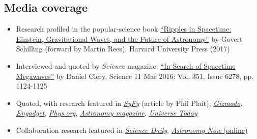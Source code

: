 \documentclass[11pt,letterpaper,sans]{moderncv}
\begin{document}
\subsection{Media coverage}
\begin{itemize}[leftmargin=8mm]
\item Research profiled in the popular-science book {\color{color1} \href{https://books.google.com/books/about/Ripples_in_Spacetime.html?id=YicuDwAAQBAJ&hl=en}{``Ripples in Spacetime: Einstein, Gravitational Waves, and the Future of Astronomy''}} by Govert Schilling (forward by Martin Rees), Harvard University Press (2017)
\item Interviewed and quoted by \textit{Science} magazine: {\color{color1} \href{http://science.sciencemag.org/content/351/6278/1124}{``In Search of Spacetime Megawaves''}} by Daniel Clery, Science  11 Mar 2016: Vol. 351, Issue 6278, pp. 1124-1125
\item Quoted, with research featured in {\color{color1} \href{https://www.syfy.com/syfywire/pulsars-black-holes-spacetime-center-of-the-solar-system}{\textit{SyFy}}} (article by Phil Plait), {\color{color1} \href{http://gizmodo.com/we-could-find-even-more-gravitational-waves-soon-with-p-1761021828}{\textit{Gizmodo}}}, {\color{color1} \href{https://www.engadget.com/2016/02/25/pulsars-gravitational-waves-black-holes/}{\textit{Engadget}}}, {\color{color1} \href{http://phys.org/news/2016-02-pulsar-web-low-frequency-gravitational.html}{\textit{Phys.org}}},  {\color{color1} \href{http://www.astronomy.com/news/2016/02/pulsar-web-could-detect-gravitational-waves}{\textit{Astronomy magazine}}}, {\color{color1} \href{http://www.universetoday.com/127562/the-future-of-gravitational-wave-astronomy-enhanced-ligo-pulsar-webs-space-interferometers-and-everything/}{\textit{Universe Today}}}
\item Collaboration research featured in {\color{color1} \href{https://www.sciencedaily.com/releases/2016/04/160405122609.htm}{\textit{Science Daily}}}, {\color{color1} \href{https://astronomynow.com/2016/04/06/gravitational-wave-search-provides-insights-into-galaxy-mergers/}{\textit{Astronomy Now} (online)}}
\end{itemize}
\end{document}
